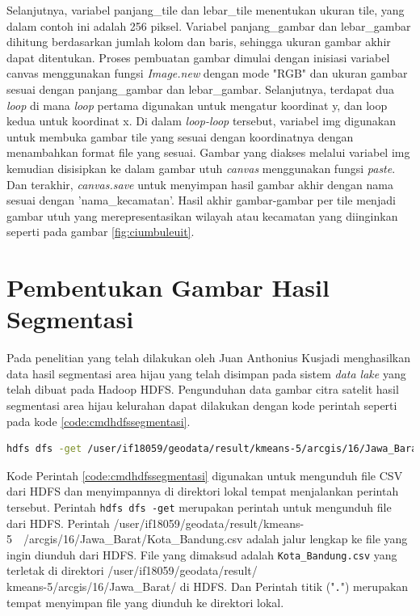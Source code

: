 Selanjutnya, variabel panjang\_tile dan lebar\_tile menentukan ukuran tile, yang dalam contoh ini adalah 256 piksel. Variabel panjang\_gambar dan lebar\_gambar dihitung berdasarkan jumlah kolom dan baris, sehingga ukuran gambar akhir dapat ditentukan. Proses pembuatan gambar  dimulai dengan inisiasi variabel canvas menggunakan fungsi \textit{Image.new }dengan mode "RGB" dan ukuran gambar sesuai dengan panjang\_gambar dan lebar\_gambar. Selanjutnya, terdapat dua \textit{loop} di mana \textit{loop} pertama digunakan untuk mengatur koordinat y, dan loop kedua untuk koordinat x. Di dalam \textit{loop-loop} tersebut, variabel img digunakan untuk membuka gambar tile yang sesuai dengan koordinatnya dengan menambahkan format file yang sesuai. Gambar yang diakses melalui variabel img kemudian disisipkan ke dalam gambar utuh \textit{canvas} menggunakan fungsi \textit{paste}. Dan terakhir, \textit{canvas.save} untuk menyimpan hasil gambar akhir dengan nama sesuai dengan 'nama\_kecamatan'. Hasil akhir gambar-gambar per tile menjadi gambar utuh yang merepresentasikan wilayah atau kecamatan yang diinginkan seperti pada gambar \ref{fig:ciumbuleuit}.

\section{Pembentukan Gambar Hasil Segmentasi}
Pada penelitian yang telah dilakukan oleh Juan Anthonius Kusjadi menghasilkan data hasil segmentasi area hijau yang telah disimpan pada sistem \textit{data lake }yang telah dibuat pada Hadoop
HDFS\cite{juan:22:pengumpulan}. Pengunduhan data gambar citra satelit hasil segmentasi area hijau kelurahan dapat dilakukan dengan kode perintah seperti pada kode \ref{code:cmdhdfssegmentasi}.

\begin{lstlisting}[language=Bash, caption= Pengembailan Data Hasil Segemntasi,label={code:cmdhdfssegmentasi}]
	hdfs dfs -get /user/if18059/geodata/result/kmeans-5/arcgis/16/Jawa_Barat/Kota_Bandung.csv .	
\end{lstlisting}

Kode Perintah \ref{code:cmdhdfssegmentasi} digunakan untuk mengunduh file CSV dari HDFS dan menyimpannya di direktori lokal tempat menjalankan perintah tersebut. Perintah \texttt{hdfs dfs -get} merupakan perintah untuk mengunduh file dari HDFS. Perintah /user/if18059/geodata/result/kmeans-5~~/arcgis/16/Jawa\_Barat/Kota\_Bandung.csv adalah jalur lengkap ke file yang ingin diunduh dari HDFS. File yang dimaksud adalah \texttt{Kota\_Bandung.csv} yang terletak di direktori /user/if18059/geodata/result/\\kmeans-5/arcgis/16/Jawa\_Barat/ di HDFS. Dan Perintah titik ("\texttt{.}") merupakan tempat menyimpan file yang diunduh ke direktori lokal.

